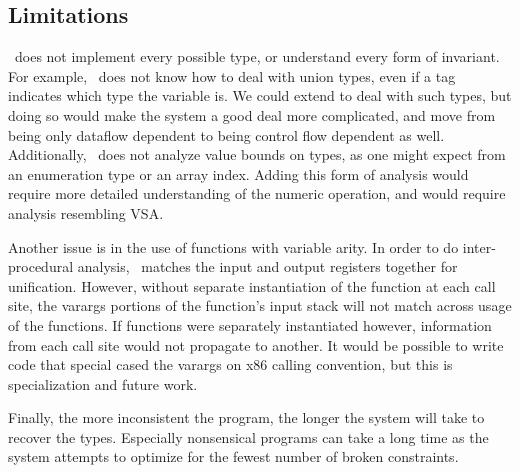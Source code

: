 \subsection{Limitations}
\bitr\ does not implement every possible type, or understand every form of invariant. For example, \bitr\ does not know how to deal with union types, even if a tag indicates which type the variable is. We could extend to deal with such types, but doing so would make the system a good deal more complicated, and move from being only dataflow dependent to being control flow dependent as well. Additionally, \bitr\ does not analyze value bounds on types, as one might expect from an enumeration type or an array index. Adding this form of analysis would require more detailed understanding of the numeric operation, and would require analysis resembling VSA\cite{vsa}.

Another issue is in the use of functions with variable arity. In order to do inter-procedural analysis, \bitr\ matches the input and output registers together for unification. However, without separate instantiation of the function at each call site, the varargs portions of the function's input stack will not match across usage of the functions. If functions were separately instantiated however, information from each call site would not propagate to another. It would be possible to write code that special cased the varargs on x86 calling convention, but this is specialization and future work.

Finally, the more inconsistent the program, the longer the system will take to recover the types. Especially nonsensical programs can take a long time as the system attempts to optimize for the fewest number of broken constraints.
